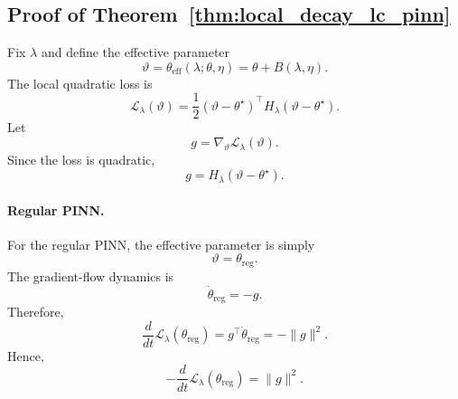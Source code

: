 \documentclass{article}
\theoremstyle{plain}
\theoremstyle{definition}
\theoremstyle{remark}
\begin{document}
\subsection{Proof of Theorem~\ref{thm:local_decay_lc_pinn}}

Fix $\lambda$ and define the effective parameter
\[
    \vartheta
    =
    \theta_{\mathrm{eff}}(\lambda;\theta,\eta)
    =
    \theta + B(\lambda,\eta).
\]
The local quadratic loss is
\[
    \mathcal{L}_{\lambda}(\vartheta)
    =
    \frac12
    (\vartheta-\theta^\star)^\top
    H_\lambda
    (\vartheta-\theta^\star).
\]
Let
\[
    g
    =
    \nabla_\vartheta
    \mathcal{L}_{\lambda}(\vartheta).
\]
Since the loss is quadratic,
\[
    g
    =
    H_\lambda
    (\vartheta-\theta^\star).
\]

\paragraph{Regular PINN.}
For the regular PINN, the effective parameter is simply
\[
    \vartheta=\theta_{\mathrm{reg}} .
\]
The gradient-flow dynamics is
\[
    \dot{\theta}_{\mathrm{reg}}
    =
    -g .
\]
Therefore,
\[
    \frac{d}{dt}
    \mathcal{L}_{\lambda}(\theta_{\mathrm{reg}})
    =
    g^\top \dot{\theta}_{\mathrm{reg}}
    =
    -\|g\|^2 .
\]
Hence,
\[
    -
    \frac{d}{dt}
    \mathcal{L}_{\lambda}(\theta_{\mathrm{reg}})
    =
    \|g\|^2 .
\]
\end{document}
